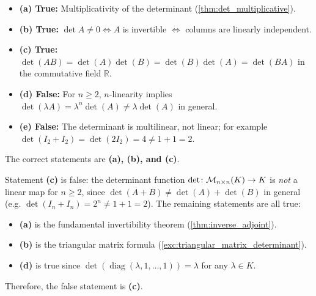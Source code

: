 \begin{exercisesolution*}
\label{sol:general_determinant_properties_mc}
\begin{itemize}
    \item \textbf{(a) True:} Multiplicativity of the determinant (\cref{thm:det_multiplicative}).
    \item \textbf{(b) True:} $\det A \ne 0 \iff A$ is invertible $\iff$ columns are linearly independent.
    \item \textbf{(c) True:} $\det(AB) = \det(A)\det(B) = \det(B)\det(A) = \det(BA)$ in the commutative field $\mathbb{R}$.
    \item \textbf{(d) False:} For $n \ge 2$, $n$-linearity implies $\det(\lambda A) = \lambda^n \det(A) \ne \lambda \det(A)$ in general.
    \item \textbf{(e) False:} The determinant is multilinear, not linear; for example $\det(I_2 + I_2) = \det(2I_2) = 4 \ne 1 + 1 = 2$.
\end{itemize}
The correct statements are \textbf{(a), (b), and (c)}.
\end{exercisesolution*}

\begin{exercisesolution*}
\label{sol:determinant_properties_linearity_sc}
Statement \textbf{(c)} is false: the determinant function $\det \colon \mathcal{M}_{n \times n}(K) \to K$ is \emph{not} a linear map for $n \ge 2$, since $\det(A + B) \ne \det(A) + \det(B)$ in general (e.g. $\det(I_n + I_n) = 2^n \ne 1 + 1 = 2$).
The remaining statements are all true:
\begin{itemize}
    \item \textbf{(a)} is the fundamental invertibility theorem (\cref{thm:inverse_adjoint}).
    \item \textbf{(b)} is the triangular matrix formula (\cref{exc:triangular_matrix_determinant}).
    \item \textbf{(d)} is true since $\det(\operatorname{diag}(\lambda, 1, \dots, 1)) = \lambda$ for any $\lambda \in K$.
\end{itemize}
Therefore, the false statement is \textbf{(c)}.
\end{exercisesolution*}

